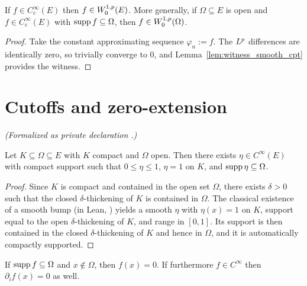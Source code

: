 \begin{lemma}
\label{lem:memW01p_of_smooth_cpt}
\leanok
{}
If $f \in C_c^\infty(E)$ then $f \in W_0^{1,p}(E)$. More generally, if $\Omega
\subseteq E$ is open and $f \in C_c^\infty(E)$ with $\operatorname{supp} f \subseteq \Omega$,
then $f \in W_0^{1,p}(\Omega)$.
\end{lemma}

\begin{proof}
\leanok
{}

Take the constant approximating sequence $\varphi_n := f$. The $L^{p}$
differences are identically zero, so trivially converge to $0$, and
Lemma~\ref{lem:witness_smooth_cpt} provides the witness.
\end{proof}

\section{Cutoffs and zero-extension}

\begin{lemma}
\label{lem:smooth_cutoff}
\leanok
\noindent\textit{(Formalized as private declaration .)}\par
Let $K \subseteq \Omega \subseteq E$ with $K$ compact and $\Omega$ open. Then
there exists $\eta \in C^\infty(E)$ with compact support such that
$0 \le \eta \le 1$, $\eta = 1$ on $K$, and $\operatorname{supp}\eta \subseteq \Omega$.
\end{lemma}

\begin{proof}
\leanok

Since $K$ is compact and contained in the open set $\Omega$, there exists
$\delta > 0$ such that the closed $\delta$-thickening of $K$ is contained in
$\Omega$. The classical existence of a smooth bump (in Lean,
) yields a smooth $\eta$
with $\eta(x) = 1$ on $K$, support equal to the open $\delta$-thickening of $K$,
and range in $[0,1]$. Its support is then contained in the closed
$\delta$-thickening of $K$ and hence in $\Omega$, and it is automatically
compactly supported.
\end{proof}

\begin{lemma}
\label{lem:zero_outside_tsupport}
\leanok
If $\operatorname{supp} f \subseteq \Omega$ and $x \notin \Omega$, then $f(x) = 0$. If
furthermore $f \in C^\infty$ then $\partial_i f(x) = 0$ as well.
\end{lemma}


